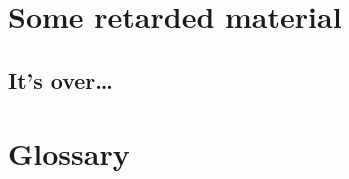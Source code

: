 \documentclass[mscthesis]{usiinfthesis}
\begin{document}
\appendix %

\chapter{Some retarded material}
\section{It's over\dots}
\lipsum 

\backmatter

\chapter{Glossary} %

%
%



\end{document}
